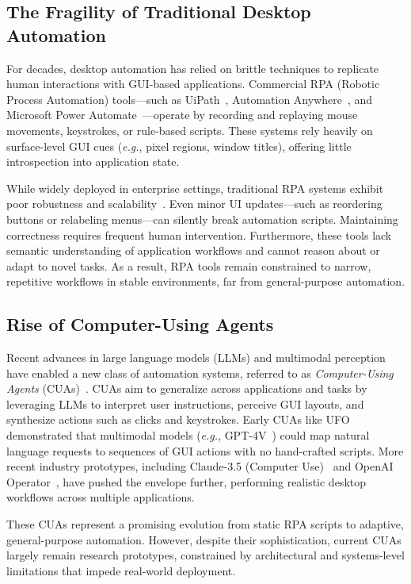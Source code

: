 \documentclass[sigplan,10pt]{acmart}
\newcommand{\eg}{\textit{e.g.},\xspace}
\begin{document}
\subsection{The Fragility of Traditional Desktop Automation}

For decades, desktop automation has relied on brittle techniques to replicate human interactions with GUI-based applications. Commercial RPA (Robotic Process Automation) tools—such as UiPath~\cite{UiPath}, Automation Anywhere~\cite{AutomationAnywhere}, and Microsoft Power Automate~\cite{PowerAutomate}—operate by recording and replaying mouse movements, keystrokes, or rule-based scripts. These systems rely heavily on surface-level GUI cues (\eg pixel regions, window titles), offering little introspection into application state.

While widely deployed in enterprise settings, traditional RPA systems exhibit poor robustness and scalability~\cite{siderska2023towards}. Even minor UI updates—such as reordering buttons or relabeling menus—can silently break automation scripts. Maintaining correctness requires frequent human intervention. Furthermore, these tools lack semantic understanding of application workflows and cannot reason about or adapt to novel tasks. As a result, RPA tools remain constrained to narrow, repetitive workflows in stable environments, far from general-purpose automation.

\subsection{Rise of Computer-Using Agents}

Recent advances in large language models (LLMs) and multimodal perception have enabled a new class of automation systems, referred to as \emph{Computer-Using Agents} (CUAs)~\cite{zhang2024large, zhao2023survey, zhang2024mm}. CUAs aim to generalize across applications and tasks by leveraging LLMs to interpret user instructions, perceive GUI layouts, and synthesize actions such as clicks and keystrokes. Early CUAs like UFO~\cite{zhang2024ufo} demonstrated that multimodal models (\eg GPT-4V~\cite{yang2023dawn}) could map natural language requests to sequences of GUI actions with no hand-crafted scripts. More recent industry prototypes, including Claude-3.5 (Computer Use)~\cite{anthropic2024} and OpenAI Operator~\cite{cua2025}, have pushed the envelope further, performing realistic desktop workflows across multiple applications.

These CUAs represent a promising evolution from static RPA scripts to adaptive, general-purpose automation. However, despite their sophistication, current CUAs largely remain research prototypes, constrained by architectural and systems-level limitations that impede real-world deployment.
\end{document}

